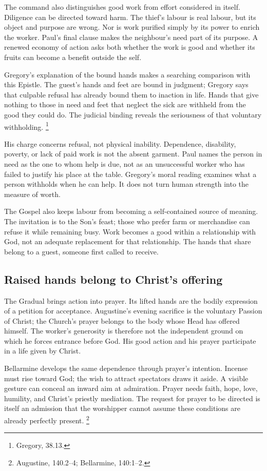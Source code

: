 The command also distinguishes good work from effort
considered in itself. Diligence can be directed toward
harm. The thief's labour is real labour, but its object
and purpose are wrong. Nor is work purified simply by
its power to enrich the worker. Paul's final clause
makes the neighbour's need part of its purpose. A
renewed economy of action asks both whether the work
is good and whether its fruits can become a benefit
outside the self.

Gregory's explanation of the bound hands makes a
searching comparison with this Epistle. The guest's
hands and feet are bound in judgment; Gregory says
that culpable refusal has already bound them to
inaction in life. Hands that give nothing to those
in need and feet that neglect the sick are withheld
from the good they could do. The judicial binding
reveals the seriousness of that voluntary withholding.
\footnote{Gregory,  38.13.}

His charge concerns refusal, not physical inability.
Dependence, disability, poverty, or lack of paid work
is not the absent garment. Paul names the person
in need as the one to whom help is due, not as an
unsuccessful worker who has failed to justify his
place at the table. Gregory's moral reading examines
what a person withholds when he can help. It does
not turn human strength into the measure of worth.

The Gospel also keeps labour from becoming a
self-contained source of meaning. The invitation
is to the Son's feast; those who prefer farm or
merchandise can refuse it while remaining busy.
Work becomes a good within a relationship with
God, not an adequate replacement for that
relationship. The hands that share belong to
a guest, someone first called to receive.

\subsection{Raised hands belong to Christ's offering}

The Gradual brings action into prayer. Its lifted
hands are the bodily expression of a petition for
acceptance. Augustine's evening sacrifice is the
voluntary Passion of Christ; the Church's prayer
belongs to the body whose Head has offered himself.
The worker's generosity is therefore not the
independent ground on which he forces entrance
before God. His good action and his prayer
participate in a life given by Christ.

Bellarmine develops the same dependence through
prayer's intention. Incense must rise toward God;
the wish to attract spectators draws it aside.
A visible gesture can conceal an inward aim
at admiration. Prayer needs faith, hope, love,
humility, and Christ's priestly mediation.
The request for prayer to be directed is itself
an admission that the worshipper cannot assume
these conditions are already perfectly present.
\footnote{Augustine,  140.2--4;
Bellarmine,  140:1--2.}

